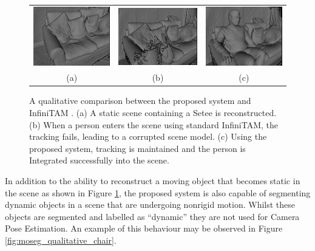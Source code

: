 \begin{figure}[ht]
  \label{fig:moseg_qualitative_setee}
  \centering
  \begin{tabular}{ccc}
    \includegraphics[height=.2\linewidth]{figures/moseg/original_sitting.png} &
    \includegraphics[height=.2\linewidth]{figures/moseg/infinitam_sitting.png} &
    \includegraphics[height=.2\linewidth]{figures/moseg/moseg_sitting.png}\\
    (a) & (b) & (c)
  \end{tabular}
  \caption[Motion Segmentation Qualitative Results I]
  {A qualitative comparison between the proposed system and InfiniTAM
    \cite{Prisacariu2014}.
    (a) A static scene containing a Setee is reconstructed.
    (b) When a person enters the scene using standard InfiniTAM, the tracking
    fails, leading to a corrupted scene model.
    (c) Using the proposed system, tracking is maintained and the person is
    Integrated successfully into the scene.}
\end{figure}

In addition to the ability to reconstruct a moving object that becomes static in
the scene as shown in Figure \ref{fig:moseg_qualitative_setee}, the proposed
system is also capable of segmenting dynamic objects in a scene that are
undergoing nonrigid motion. Whilst these objects are segmented and labelled as
``dynamic'' they are not used for Camera Pose Estimation. An example of this
behaviour may be observed in Figure \ref{fig:moseg_qualitative_chair}.

